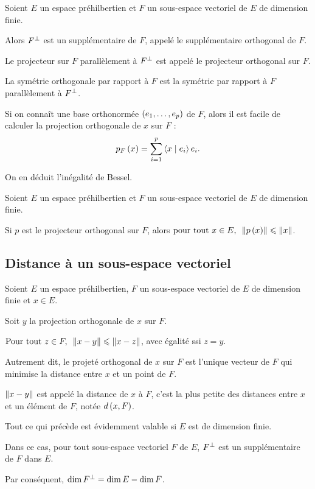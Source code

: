 \begin{defi}
Soient \(E\) un espace préhilbertien et \(F\) un sous-espace vectoriel de \(E\) de dimension finie.

Alors \(F^{\perp}\) est un supplémentaire de \(F\), appelé le supplémentaire orthogonal de \(F\).

Le projecteur sur \(F\) parallèlement à \(F^{\perp}\) est appelé le projecteur orthogonal sur \(F\).

La symétrie orthogonale par rapport à \(F\) est la symétrie par rapport à \(F\) parallèlement à \(F^{\perp}\).
\end{defi}

Si on connaît une base orthonormée \(\left(e_1,\dots,e_p\right)\) de \(F\), alors il est facile de calculer la projection orthogonale de \(x\) sur \(F\) : \[p_F\paren{x}=\sum_{i=1}^p\ps{x}{e_i}e_i.\]

On en déduit l'inégalité de Bessel.

\begin{prop}
Soient \(E\) un espace préhilbertien et \(F\) un sous-espace vectoriel de \(E\) de dimension finie.

Si \(p\) est le projecteur orthogonal sur \(F\), alors \(\quantifs{\tpt x\in E}\norme{p\paren{x}}\leq\norme{x}\).
\end{prop}

\subsection{Distance à un sous-espace vectoriel}

\begin{prop}
Soient \(E\) un espace préhilbertien, \(F\) un sous-espace vectoriel de \(E\) de dimension finie et \(x\in E\).

Soit \(y\) la projection orthogonale de \(x\) sur \(F\).

\(\quantifs{\Tpt z\in F}\norme{x-y}\leq\norme{x-z}\), avec égalité ssi \(z=y\).
\end{prop}

Autrement dit, le projeté orthogonal de \(x\) sur \(F\) est l'unique vecteur de \(F\) qui minimise la distance entre \(x\) et un point de \(F\).

\(\norme{x-y}\) est appelé la distance de \(x\) à \(F\), c'est la plus petite des distances entre \(x\) et un élément de \(F\), notée \(d\left(x,F\right)\).

\begin{rem}
Tout ce qui précède est évidemment valable si \(E\) est de dimension finie.

Dans ce cas, pour tout sous-espace vectoriel \(F\) de \(E\), \(F^{\perp}\) est un supplémentaire de \(F\) dans \(E\).

Par conséquent, \(\dim F^{\perp}=\dim E-\dim F\).
\end{rem}
